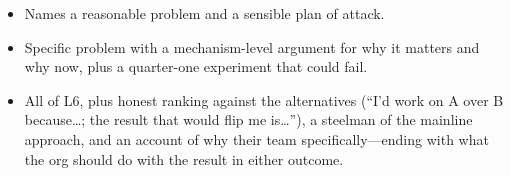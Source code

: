 \begin{interviewq}

\goodgreat
\begin{itemize}
    \item {} Names a reasonable problem and a sensible plan of attack.
    \item {} Specific problem with a mechanism-level argument for why it matters and why now, plus a quarter-one experiment that could fail.
    \item {} All of L6, plus honest ranking against the alternatives (``I'd work on A over B because\ldots; the result that would flip me is\ldots''), a steelman of the mainline approach, and an account of why their team specifically---ending with what the org should do with the result in either outcome.
\end{itemize}

\end{interviewq}


